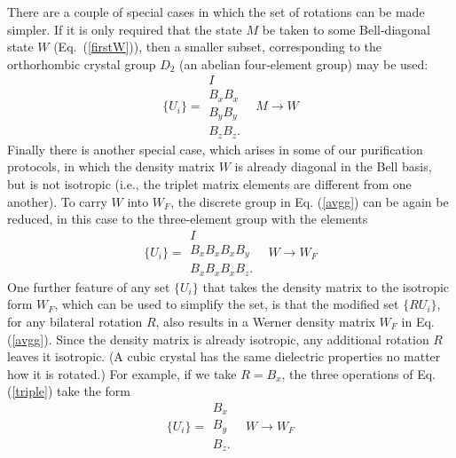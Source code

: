 There are a couple of special cases in which the set of rotations
can be made simpler.  If it is only required that the state $M$ be
taken to some Bell-diagonal state $W$ (Eq.~(\ref{firstW})), then a
smaller subset, corresponding to the orthorhombic crystal group
$D_2$ (an abelian four-element group) may be used:
\begin{equation}
\{U_i\}=
\begin{array}{l}
I\\
B_xB_x\\
B_yB_y\\
B_zB_z.\end{array}\;\;\;M\rightarrow W
\end{equation}
Finally there is another special case, which arises in some of our
purification protocols, in which the density matrix $W$ is already
diagonal in the Bell basis, but is not isotropic (i.e., the triplet
matrix elements are different from one another).  To carry $W$ into
$W_F$, the discrete group in Eq. (\ref{avgg}) can be again be reduced,
in this case to the three-element group with the elements
\begin{equation}
\{U_i\}=
\begin{array}{l}
I\\
B_xB_xB_xB_y\\
B_xB_xB_xB_z.
\end{array}\;\;\;W\rightarrow W_F
\label{triple}
\end{equation}
One further feature of any set $\{U_i\}$ that takes the density matrix
to the isotropic form $W_F$, which can be used to simplify the set, is
that the modified set $\{RU_i\}$, for any bilateral rotation $R$, also
results in a Werner density matrix $W_F$ in Eq. (\ref{avgg}).  Since
the density matrix is already isotropic, any additional rotation $R$
leaves it isotropic.  (A cubic crystal has the same dielectric
properties no matter how it is rotated.)  For example, if we take
$R=B_x$, the three operations of Eq. (\ref{triple}) take the form
\begin{equation}
\{U_i\}=
\begin{array}{l}
B_x\\
B_y\\
B_z.
\end{array}\;\;\;W\rightarrow W_F
\label{easytriple}
\end{equation}
 
